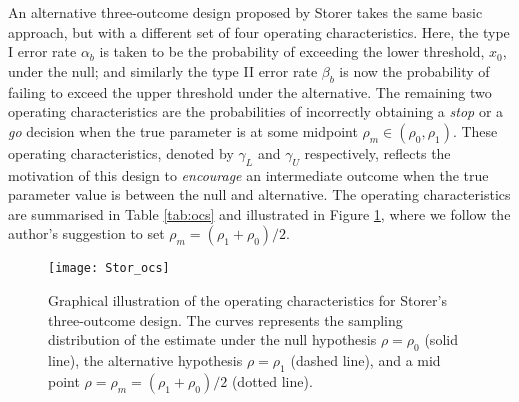 \documentclass[referee, lineno, pdflatex,sn-vancouver,Numbered]{sn-jnl}%
\theoremstyle{thmstyleone}%
\theoremstyle{thmstyletwo}%
\theoremstyle{thmstylethree}%
\begin{document}
An alternative three-outcome design proposed by Storer \cite{Storer1992} takes the same basic approach, but with a different set of four operating characteristics. Here, the type I error rate $\alpha_b$ is taken to be the probability of exceeding the lower threshold, $x_0$, under the null; and similarly the type II error rate $\beta_b$ is now the probability of failing to exceed the upper threshold under the alternative. The remaining two operating characteristics are the probabilities of incorrectly obtaining a \emph{stop} or a \emph{go} decision when the true parameter is at some midpoint $\rho_m \in (\rho_0, \rho_1)$. These operating characteristics, denoted by $\gamma_L$ and $\gamma_U$ respectively, reflects the motivation of this design to \emph{encourage} an intermediate outcome when the true parameter value is between the null and alternative. The operating characteristics are summarised in Table \ref{tab:ocs} and illustrated in Figure \ref{fig:Stor_ocs}, where we follow the author's suggestion to set $\rho_m = (\rho_1 + \rho_0)/2$.

\begin{figure}
\centering
\texttt{[image: Stor\_ocs]}
\caption{Graphical illustration of the operating characteristics for Storer's three-outcome design\cite{Storer1992}. The curves represents the sampling distribution of the estimate under the null hypothesis $\rho = \rho_0$ (solid line), the alternative hypothesis $\rho = \rho_1$ (dashed line), and a mid point $\rho = \rho_m = (\rho_1 + \rho_0)/2$ (dotted line).}
\label{fig:Stor_ocs}
\end{figure}
\end{document}
